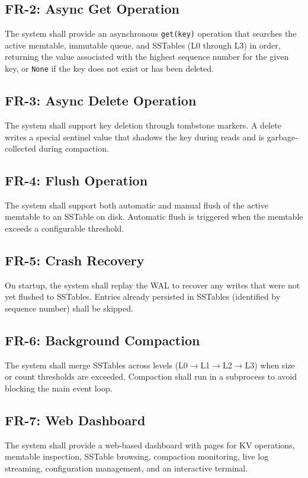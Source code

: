 \documentclass[oneside,a4paper,12pt]{book}
\begin{document}
\subsection{FR-2: Async Get Operation}
The system shall provide an asynchronous \texttt{get(key)} operation that searches the active memtable, immutable queue, and SSTables (L0 through L3) in order, returning the value associated with the highest sequence number for the given key, or \texttt{None} if the key does not exist or has been deleted.

\subsection{FR-3: Async Delete Operation}
The system shall support key deletion through tombstone markers. A delete writes a special sentinel value that shadows the key during reads and is garbage-collected during compaction.

\subsection{FR-4: Flush Operation}
The system shall support both automatic and manual flush of the active memtable to an SSTable on disk. Automatic flush is triggered when the memtable exceeds a configurable threshold.

\subsection{FR-5: Crash Recovery}
On startup, the system shall replay the WAL to recover any writes that were not yet flushed to SSTables. Entries already persisted in SSTables (identified by sequence number) shall be skipped.

\subsection{FR-6: Background Compaction}
The system shall merge SSTables across levels (L0$\rightarrow$L1$\rightarrow$L2$\rightarrow$L3) when size or count thresholds are exceeded. Compaction shall run in a subprocess to avoid blocking the main event loop.

\subsection{FR-7: Web Dashboard}
The system shall provide a web-based dashboard with pages for KV operations, memtable inspection, SSTable browsing, compaction monitoring, live log streaming, configuration management, and an interactive terminal.
\end{document}
